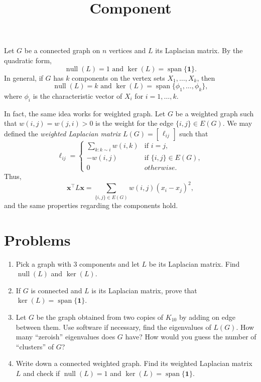 \documentclass{article}
\title{Component}
\date{\vspace{-1cm}}
\newcommand{\trans}{^\top}
\newcommand{\bone}{\mathbf{1}}
\newcommand{\bx}{\mathbf{x}}
\newcommand{\nul}{\operatorname{null}}
\newcommand{\vspan}{\operatorname{span}}
\theoremstyle{definition}
\begin{document}
\maketitle
\large

Let $G$ be a connected graph on $n$ vertices and $L$ its Laplacian matrix.  By the quadratic form, 
\[\nul(L) = 1 \text{ and }\ker(L) = \vspan\{\bone\}.\]
In general, if $G$ has $k$ components on the vertex sets $X_1,\ldots, X_k$, then 
\[\nul(L) = k \text{ and } \ker(L) = \vspan\{\phi_1,\ldots,\phi_k\},\] 
where $\phi_i$ is the characteristic vector of $X_i$ for $i = 1,\ldots, k$.

In fact, the same idea works for weighted graph.  Let $G$ be a weighted graph such that $w(i,j) = w(j,i) > 0$ is the weight for the edge $\{i,j\}\in E(G)$.  We may defined the \emph{weighted Laplacian matrix} $L(G) = \begin{bmatrix} \ell_{ij} \end{bmatrix}$ such that 
\[\ell_{ij} = \begin{cases}
\sum_{k:k\sim i} w(i,k) & \text{if }i = j, \\
-w(i,j) & \text{if }\{i,j\}\in E(G), \\
0 & otherwise.
\end{cases}\]
Thus, 
\[\bx\trans L\bx = \sum_{\{i,j\}\in E(G)}w(i,j)(x_i - x_j)^2,\]
and the same properties regarding the components hold.

\section*{Problems}
\begin{enumerate}
\setlength\itemsep{2em}
\item Pick a graph with $3$ components and let $L$ be its Laplacian matrix.  Find $\nul(L)$ and $\ker(L)$.
\item If $G$ is connected and $L$ is its Laplacian matrix, prove that $\ker(L) = \vspan\{\bone\}$.  
\item Let $G$ be the graph obtained from two copies of $K_{10}$ by adding on edge between them.  Use software if necessary, find the eigenvalues of $L(G)$.  How many ``zeroish'' eigenvalues does $G$ have?  How would you guess the number of ``clusters'' of $G$?
\item Write down a connected weighted graph.  Find its weighted Laplacian matrix $L$ and check if $\nul(L) = 1$ and $\ker(L) = \vspan\{\bone\}$.
\end{enumerate}

\end{document}
